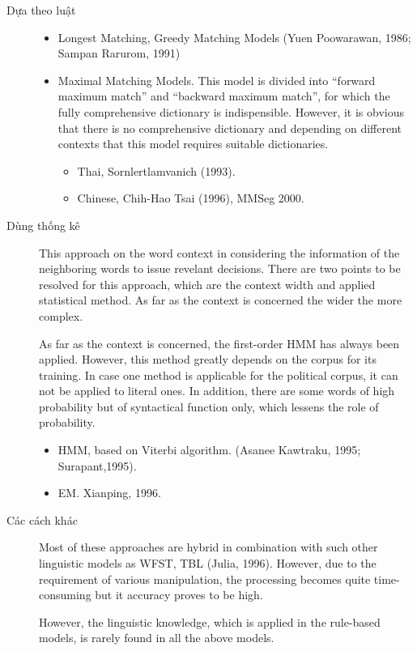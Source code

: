 \documentclass[a4paper,oneside]{book} %
\theoremstyle{break}
\begin{document}
\begin{description}
\item[Dựa theo luật] 
  \begin{itemize}
  \item Longest Matching, Greedy Matching Models (Yuen Poowarawan, 1986;
    Sampan Rarurom, 1991)
  \item Maximal Matching Models. This model is divided into ``forward
    maximum match'' and ``backward maximum match'', for which the fully
    comprehensive dictionary is indispensible. However, it is obvious
    that there is no comprehensive dictionary and depending on different
    contexts that this model requires suitable dictionaries.
    \begin{itemize}
    \item Thai, Sornlertlamvanich (1993).
    \item Chinese, Chih-Hao Tsai (1996), MMSeg 2000.
    \end{itemize}
  \end{itemize}
\item[Dùng thống kê]
  This approach on the word context in considering
  the information of the neighboring words to issue revelant
  decisions. There are two points to be resolved for this approach,
  which are the context width and applied statistical method. As far
  as the context is concerned the wider the more complex.

  As far as the context is concerned, the first-order HMM has always
  been applied. However, this method greatly depends on the corpus for
  its training. In case one method is applicable for the political
  corpus, it can not be applied to literal ones. In addition, there
  are some words of high probability but of syntactical function only,
  which lessens the role of probability.
  \begin{itemize}
  \item HMM, based on Viterbi algorithm. (Asanee Kawtraku, 1995;
    Surapant,1995).
  \item EM. Xianping, 1996.
  \end{itemize}
\item[Các cách khác]
  Most of these approaches are hybrid in combination with such other
  linguistic models as WFST, TBL (Julia, 1996). However, due to the
  requirement of various manipulation, the processing becomes quite
  time-consuming but it accuracy proves to be high.

  However, the linguistic knowledge, which is applied in the
  rule-based models, is rarely found in all the above models.
\end{description}
\end{document}
